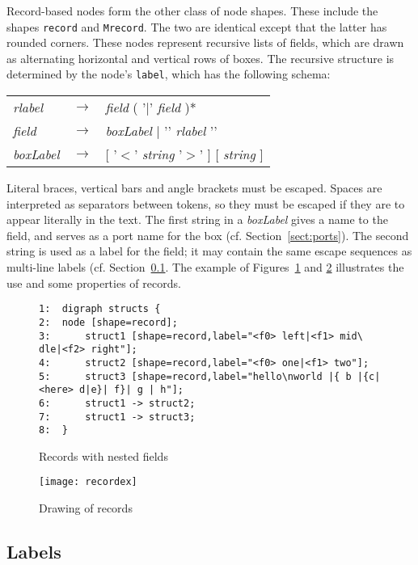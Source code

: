 \documentclass[11pt]{article}
\begin{document}
Record-based nodes form the other class of node shapes. 
These include the
shapes {\tt record} and {\tt Mrecord}. The two are identical
except that the latter has rounded corners. These nodes represent
recursive lists of fields, which are drawn as alternating horizontal
and vertical rows of boxes. The recursive structure is determined by
the node's {\tt label}, which has the following schema: \\
\begin{table}[h]
\begin{tabular}{lll}
{\it rlabel}  & $\rightarrow$ & {\it field} ( '$|$' {\it field} )* \\
{\it field}  & $\rightarrow$ & {\it boxLabel} $|$ '{' {\it rlabel} '}' \\
{\it boxLabel}  & $\rightarrow$ & [ '$<$' {\it string} '$>$' ] [ {\it string} ] \\
\end{tabular}
\end{table}

Literal braces, vertical bars and angle brackets must be escaped. 
Spaces are interpreted as separators between tokens, so they
must be escaped if they are to appear literally in the text.
The first string in a {\it boxLabel} gives a name to the field,
and serves as a port name for the box (cf. Section~\ref{sect:ports}).
The second string is used as a label for the field; 
it may contain the same escape sequences as multi-line 
labels (cf. Section~\ref{sect:labels}.
The example of Figures~\ref{fig:record} and \ref{fig:recorddrawing}
illustrates the use and some properties of records.

\begin{figure}[p]\footnotesize
\begin{verbatim}
1:  digraph structs {
2:  node [shape=record];
3:      struct1 [shape=record,label="<f0> left|<f1> mid\ dle|<f2> right"];
4:      struct2 [shape=record,label="<f0> one|<f1> two"];
5:      struct3 [shape=record,label="hello\nworld |{ b |{c|<here> d|e}| f}| g | h"];
6:      struct1 -> struct2;
7:      struct1 -> struct3;
8:  }
\end{verbatim}
\caption{Records with nested fields}
\label{fig:record}
\end{figure}
\begin{figure}[p]
	\centerline {
		\texttt{[image: recordex]}
	}
    \caption{Drawing of records}
    \label{fig:recorddrawing}
\end{figure}

\subsection{Labels}
\label{sect:labels}
\end{document}
